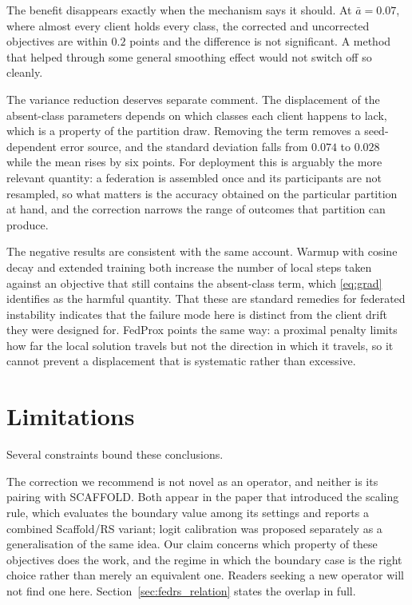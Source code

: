 \documentclass[journal]{IEEEtran}
\begin{document}
The benefit disappears exactly when the mechanism says it should. At
$\bar{a}=0.07$, where almost every client holds every class, the corrected and
uncorrected objectives are within $0.2$ points and the difference is not
significant. A method that helped through some general smoothing effect would
not switch off so cleanly.

The variance reduction deserves separate comment. The displacement of the
absent-class parameters depends on which classes each client happens to lack,
which is a property of the partition draw. Removing the term removes a
seed-dependent error source, and the standard deviation falls from $0.074$ to
$0.028$ while the mean rises by six points. For deployment this is arguably the
more relevant quantity: a federation is assembled once and its participants are
not resampled, so what matters is the accuracy obtained on the particular
partition at hand, and the correction narrows the range of outcomes that
partition can produce.

The negative results are consistent with the same account. Warmup with cosine
decay and extended training both increase the number of local steps taken
against an objective that still contains the absent-class term, which
\eqref{eq:grad} identifies as the harmful quantity. That these are standard
remedies for federated instability indicates that the failure mode here is
distinct from the client drift they were designed for. FedProx points the same
way: a proximal penalty limits how far the local solution travels but not the
direction in which it travels, so it cannot prevent a displacement that is
systematic rather than excessive.

\section{Limitations}
\label{sec:limits}

Several constraints bound these conclusions.

The correction we recommend is not novel as an operator, and neither is its
pairing with SCAFFOLD. Both appear in the paper that introduced the scaling
rule, which evaluates the boundary value among its settings and reports a
combined Scaffold/RS variant; logit calibration was proposed separately as a
generalisation of the same idea. Our claim concerns which property of these
objectives does the work, and the regime in which the boundary case is the right
choice rather than merely an equivalent one. Readers seeking a new operator will
not find one here. Section~\ref{sec:fedrs_relation} states the overlap in full.
\end{document}
